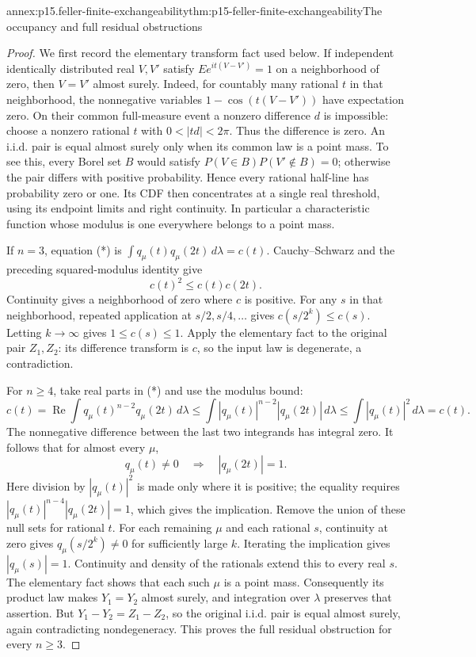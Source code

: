 \begin{annexitem}{annex:p15.feller-finite-exchangeability}{thm:p15-feller-finite-exchangeability}{The occupancy and full residual obstructions}
\begin{proof}
We first record the elementary transform fact used below.
If independent identically distributed real \(V,V'\) satisfy
\(E e^{it(V-V')}=1\) on a neighborhood of zero, then \(V=V'\)
almost surely. Indeed, for countably many rational \(t\) in that
neighborhood, the nonnegative variables \(1-\cos(t(V-V'))\)
have expectation zero. On their common full-measure event a nonzero
difference \(d\) is impossible: choose a nonzero rational \(t\) with
\(0<|td|<2\pi\). Thus the difference is zero.
An i.i.d. pair is equal almost surely only when its common law is
a point mass. To see this, every Borel set \(B\) would satisfy
\(P(V\in B)P(V'\notin B)=0\); otherwise the pair differs with
positive probability. Hence every rational half-line has probability
zero or one. Its CDF then concentrates at a single real threshold,
using its endpoint limits and right continuity.
In particular a characteristic function whose modulus is one
everywhere belongs to a point mass.

If \(n=3\), equation (*) is
\(\int q_\mu(t)q_\mu(2t)\,d\lambda=c(t)\).
Cauchy--Schwarz and the preceding squared-modulus identity give
\[
                              c(t)^2\leq c(t)c(2t).
\]
Continuity gives a neighborhood of zero where \(c\) is positive.
For any \(s\) in that neighborhood, repeated application at
\(s/2,s/4,\ldots\) gives \(c(s/2^k)\leq c(s)\).
Letting \(k\to\infty\) gives \(1\leq c(s)\leq1\).
Apply the elementary fact to the original pair \(Z_1,Z_2\):
its difference transform is \(c\), so the input law is degenerate,
a contradiction.

For \(n\geq4\), take real parts in (*) and use the modulus bound:
\[
 c(t)=\operatorname{Re}\int q_\mu(t)^{n-2}q_\mu(2t)\,d\lambda
       \leq\int |q_\mu(t)|^{n-2}|q_\mu(2t)|\,d\lambda
       \leq\int|q_\mu(t)|^2\,d\lambda=c(t).
\]
The nonnegative difference between the last two integrands has
integral zero. It follows that for almost every \(\mu\),
\[
                  q_\mu(t)\ne0\quad\Longrightarrow\quad
                                      |q_\mu(2t)|=1.
\]
Here division by \(|q_\mu(t)|^2\) is made only where it is positive;
the equality requires
\(|q_\mu(t)|^{n-4}|q_\mu(2t)|=1\), which gives the implication.
Remove the union of these null sets for rational \(t\).
For each remaining \(\mu\) and each rational \(s\), continuity at zero
gives \(q_\mu(s/2^k)\ne0\) for sufficiently large \(k\).
Iterating the implication gives \(|q_\mu(s)|=1\).
Continuity and density of the rationals extend this to every real \(s\).
The elementary fact shows that each such \(\mu\) is a point mass.
Consequently its product law makes \(Y_1=Y_2\) almost surely,
and integration over \(\lambda\) preserves that assertion.
But \(Y_1-Y_2=Z_1-Z_2\), so the original i.i.d. pair is equal
almost surely, again contradicting nondegeneracy.
This proves the full residual obstruction for every \(n\geq3\).


\end{proof}
\end{annexitem}
